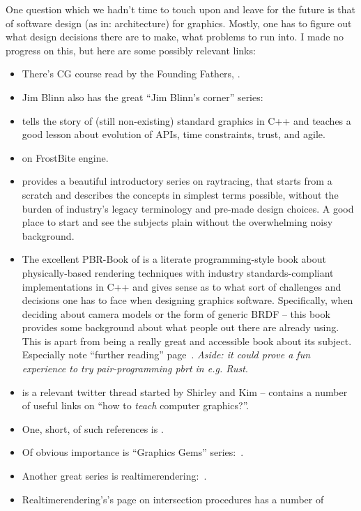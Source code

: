 One question which we hadn't time to touch upon and leave for the future is
that of software design (as in: architecture) for graphics.
Mostly, one has to figure out what design decisions there are to make,
what problems to run into. I made no progress on this, but here are some
possibly relevant links:
\begin{itemize}
\item There's CG course read by the Founding Fathers, \citet{blinnCatmullCG}.
\item Jim Blinn also has the great ``Jim Blinn's corner'' series:
\citet{jimTripPipeline,jimDirtyPixels,jimDirtyPixels}
\item \citet{sg13ApiFailed} tells the story of (still non-existing) standard
graphics in C++ and teaches a good lesson about evolution of APIs, time
constraints, trust, and agile.
\item \citet{oDennellFrameGraph} on FrostBite engine.
\item \citet{shirleyRTWeekend} provides a beautiful introductory series on
raytracing, that starts from a scratch and describes the concepts in simplest
terms possible, without the burden of industry's legacy terminology and
pre-made design choices. A good place to start and see the subjects plain
without the overwhelming noisy background.
\item The excellent PBR-Book of \citet{pbrBook} is a literate
programming-style book about physically-based rendering techniques with industry
standards-compliant implementations in C++ and gives sense as to what sort of
challenges and decisions one has to face when designing graphics software.
Specifically, when deciding about camera models or the form of
generic BRDF -- this book provides some background about what people out there
are already using. This is apart from being a really great and accessible book
about its subject. Especially note ``further reading'' page~\cite{pbrBookReading}.
\emph{Aside: it could prove a fun experience to try pair-programming pbrt in
e.g. Rust}.
\item \cite{shirleyKimTeaching} is a relevant twitter thread started by Shirley
and Kim -- contains a number of useful links on ``how to \emph{teach} computer
graphics?''.
\item One, short, of such references is \citet{texnh}.
\item Of obvious importance is ``Graphics Gems'' series:~\citet{graphicsGems}.
\item Another great series is realtimerendering:~\citet{RTR4}.
\item Realtimerendering's's page on intersection procedures has a number of

\end{itemize}
